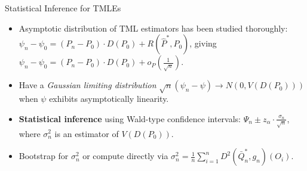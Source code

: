 \documentclass[12pt,t]{beamer}
\begin{document}
\begin{frame}[c]{Statistical Inference for TMLEs}

\begin{center}
\begin{itemize}
  \itemsep10pt
  \item Asymptotic distribution of TML estimators has been studied thoroughly:
    $\psi_n - \psi_0 = (P_n - P_0) \cdot D(P_0) + R(\hat{P}^*, P_0)$, giving
    $\psi_n - \psi_0 = (P_n - P_0) \cdot D(P_0) + o_P \left( \frac{1}{\sqrt{n}}
    \right)$.
  \item Have a \textit{Gaussian limiting distribution}
    $\sqrt{n}(\psi_n - \psi) \to N(0, V(D(P_0)))$ when $\psi$ exhibits
    asymptotically linearity.
  \item \textbf{Statistical inference} using Wald-type confidence intervals:
    $\Psi_n \pm z_{\alpha} \cdot \frac{\sigma_n}{\sqrt{n}}$, where $\sigma_n^2$
    is an estimator of $V(D(P_0))$.
  \item Bootstrap for $\sigma_n^2$ or compute directly via
    $\sigma_n^2 = \frac{1}{n} \sum_{i = 1}^{n} D^2(\bar{Q}_n^*, g_n)(O_i)$.
\end{itemize}
\end{center}


\end{frame}

\end{document}
